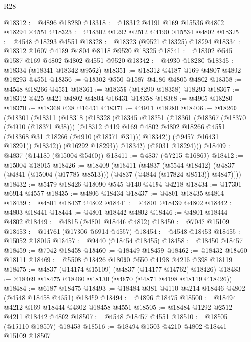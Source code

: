 \begin{lexlean}{R28}
\begin{coremodule}
@18312 := @4896 @18280
@18318 := @18312 @4191 @169 @15536 @4802 @18294 @4551
@18323 := @18302 @1292 @2512 @4190 @15534 @4802
@18325 := @4548 @18293 @4551
@18328 := @18323 (@9521 @18325) @18294
@18334 := @18312 @1607 @4189 @4804 @8118 @9520 @18325
@18341 := @18302 @545 @1587 @169 @4802 @4802 @4551 @9520
@18342 := @4930 @18280
@18345 := @18334 (@18341 @18342 @9562)
@18351 := @18312 @4187 @169 @4807 @4802 @18293 @4551
@18356 := @18302 @550 @1587 @4186 @4805 @4802
@18358 := @4548 @18266 @4551
@18361 := @18356 (@18290 @18358) @18293
@18367 := @18312 @425 @421 @4802 @4804 @16431 @18358
@18368 := @4905 @18280
@18370 := @18368 @38 @16431
@18371 := @4911 @18280
@18406 := @18260
    (@18301
      (@18311
        (@18318
          (@18328
            (@18345
              (@18351
                (@18361
                  (@18367
                    (@18370 (@4910 (@18371 @38)))
                    (@18312
                      @419
                      @169
                      @4802
                      @4802
                      @18266
                      @4551
                      (@18368 @31 @18266 (@4910 (@18371 @31)))
                      @18342))
                  (@9457 @16431 @18291))
                @18342))
            (@16292 @18293))
          @18342)
        (@8031 @18294)))
@18409 := @4837 (@14180 (@15004 @5460))
@18411 := @4837 (@7215 @16869)
@18412 := @15004 @18015
@18426 := @18409
    (@18411
      (@4837
        (@5544 @18412)
        (@4837 (@4841 (@15004 (@17785 @8513))) (@4837 (@4844 (@17824 @8513)) @4847))))
@18432 := @5479 @18426 @18090 @545 @140 @4194 @4218
@18434 := @17301 @6914 @4557
@18435 := @4806 @18434
@18437 := @4801 @18435 @4804
@18439 := @4801 @18437 @4802
@18441 := @4801 @18439 @4802
@18442 := @4803 @18441
@18444 := @4801 @18442 @4802
@18446 := @4801 @18444 @4802
@18449 := @4815 (@4801 @18446 @4802)
@18450 := @7043 @15109
@18453 := @14761 (@17306 @6914 @4557)
@18454 := @4548 @18453
@18455 := @15052 @18015
@18457 := @9440 (@18454 @18455)
@18458 := @18450 @18457
@18459 := @7042 @18458
@18460 := @18449 @18459
@18462 := @18432 @18460 @18111
@18469 := @5508 @18426 @18090 @550 @4198 @4215 @398 @18119
@18475 := @4837 (@14174 @15109) (@4837 (@14177 @14762) @18426)
@18483 := @18469 @18475 @18460 @18130 (@4870 (@4871 @4198 @18119 @18426))
@18484 := @6187 @18475
@18493 := @18484 @381 @4110 @4214 @18446 @4802 (@4548 @18458 @4551) @18459
@18494 := @4896 @18475
@18500 := @18494 @4212 @169 @18444 @4802 @18458 @4551
@18505 := @18484 @1292 @2512 @4211 @18442 @4802
@18507 := @4548 @18457 @4551
@18510 := @18505 (@15110 @18507) @18458
@18516 := @18494 @1503 @4210 @4802 @18441 @15109 @18507

\end{coremodule}
\end{lexlean}
